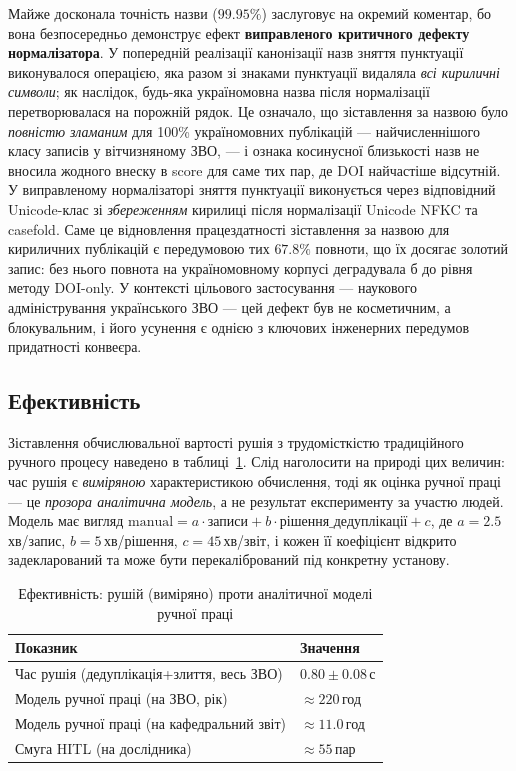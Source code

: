 Майже досконала точність назви ($99.95\%$) заслуговує на окремий коментар, бо вона безпосередньо демонструє ефект \textbf{виправленого критичного дефекту нормалізатора}. У попередній реалізації канонізації назв зняття пунктуації виконувалося операцією, яка разом зі знаками пунктуації видаляла \textit{всі кириличні символи}; як наслідок, будь-яка україномовна назва після нормалізації перетворювалася на порожній рядок. Це означало, що зіставлення за назвою було \textit{повністю зламаним} для 100\% україномовних публікацій --- найчисленнішого класу записів у вітчизняному ЗВО, --- і ознака косинусної близькості назв не вносила жодного внеску в score для саме тих пар, де DOI найчастіше відсутній. У виправленому нормалізаторі зняття пунктуації виконується через відповідний Unicode-клас зі \textit{збереженням} кирилиці після нормалізації Unicode NFKC та casefold. Саме це відновлення працездатності зіставлення за назвою для кириличних публікацій є передумовою тих $67.8\%$ повноти, що їх досягає золотий запис: без нього повнота на україномовному корпусі деградувала б до рівня методу DOI-only. У контексті цільового застосування --- наукового адміністрування українського ЗВО --- цей дефект був не косметичним, а блокувальним, і його усунення є однією з ключових інженерних передумов придатності конвеєра.

\subsection*{Ефективність}

Зіставлення обчислювальної вартості рушія з трудомісткістю традиційного ручного процесу наведено в таблиці~\ref{tab:res-eff}. Слід наголосити на природі цих величин: час рушія є \textit{виміряною} характеристикою обчислення, тоді як оцінка ручної праці --- це \textit{прозора аналітична модель}, а не результат експерименту за участю людей. Модель має вигляд $\text{manual} = a \cdot \text{записи} + b \cdot \text{рішення\_дедуплікації} + c$, де $a = 2.5$\,хв/запис, $b = 5$\,хв/рішення, $c = 45$\,хв/звіт, і кожен її коефіцієнт відкрито задекларований та може бути перекалібрований під конкретну установу.

\begin{table}[ht]
\centering
\caption{Ефективність: рушій (виміряно) проти аналітичної моделі ручної праці}
\label{tab:res-eff}
\begin{tabular}{ll}
\toprule
Показник & Значення \\
\midrule
Час рушія (дедуплікація+злиття, весь ЗВО) & $0.80 \pm 0.08$\,с \\
Модель ручної праці (на ЗВО, рік) & $\approx 220$\,год \\
Модель ручної праці (на кафедральний звіт) & $\approx 11.0$\,год \\
Смуга HITL (на дослідника) & $\approx 55$\,пар \\
\bottomrule
\end{tabular}
\end{table}

